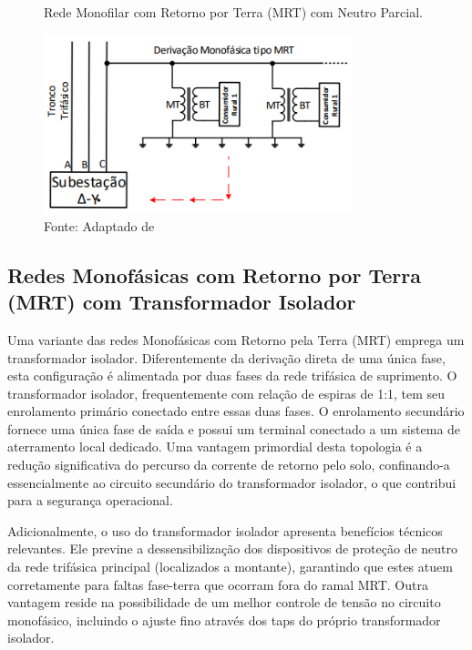 \documentclass[oneside,openright,12pt]{ufsm_2021} %
\begin{document}
\begin{figure}[H]
	\centering
	\caption{Rede Monofilar com Retorno por Terra (MRT) com Neutro Parcial.}
	\includegraphics[width=0.8\textwidth]{figuras/Imagem2Fandi2013.png}
	\caption*{Fonte: Adaptado de \cite{fandi_sistema_2013}}
	\label{fig:RedeMonofasicaComRetornoPorTerraNeutroParcialAdptadoFandi2013}
\end{figure}

\subsection{Redes Monofásicas com Retorno por Terra (MRT) com Transformador Isolador}

\par Uma variante das redes Monofásicas com Retorno pela Terra (MRT) emprega um transformador isolador. Diferentemente da derivação direta de uma única fase, esta configuração é alimentada por duas fases da rede trifásica de suprimento. O transformador isolador, frequentemente com relação de espiras de 1:1, tem seu enrolamento primário conectado entre essas duas fases. O enrolamento secundário fornece uma única fase de saída e possui um terminal conectado a um sistema de aterramento local dedicado. Uma vantagem primordial desta topologia é a redução significativa do percurso da corrente de retorno pelo solo, confinando-a essencialmente ao circuito secundário do transformador isolador, o que contribui para a segurança operacional.

\par Adicionalmente, o uso do transformador isolador apresenta benefícios técnicos relevantes. Ele previne a dessensibilização dos dispositivos de proteção de neutro da rede trifásica principal (localizados a montante), garantindo que estes atuem corretamente para faltas fase-terra que ocorram fora do ramal MRT. Outra vantagem reside na possibilidade de um melhor controle de tensão no circuito monofásico, incluindo o ajuste fino através dos taps do próprio transformador isolador.
\end{document}
